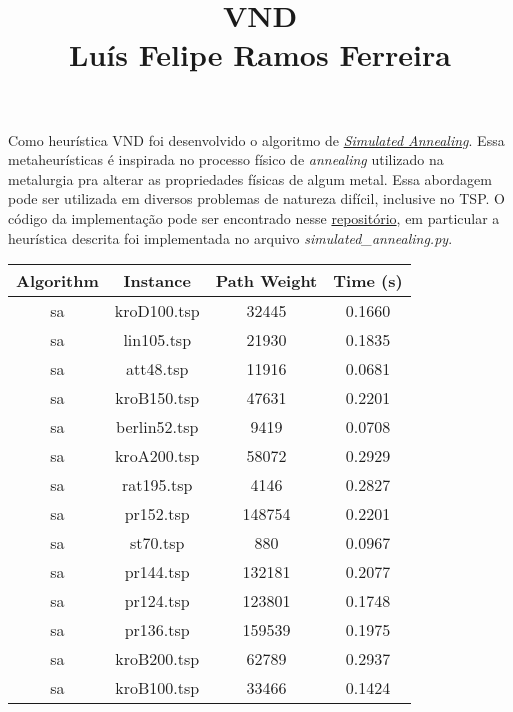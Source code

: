 \documentclass{article}
\title{\vspace{-3em} VND \\ Luís Felipe Ramos Ferreira \vspace{-3em}}
\date{}
\begin{document}
\maketitle

Como heurística VND foi desenvolvido o algoritmo de \href{https://en.wikipedia.org/wiki/Simulated_annealing}{\textit{Simulated Annealing}}. Essa metaheurísticas é inspirada
no processo físico de \textit{annealing} utilizado na metalurgia pra alterar as propriedades físicas de algum metal. Essa abordagem pode ser utilizada em diversos problemas de natureza difícil,
inclusive no TSP. O código da implementação pode ser encontrado nesse \href{https://github.com/lframosferreira/tsp-heuristics}{repositório}, em particular a heurística descrita foi implementada no arquivo
\textit{simulated\_annealing.py}.

\begin{center}
	\begin{table}[h!]
		\centering
		\begin{tabular}{|c|c|c|c|}
			\hline
			Algorithm & Instance     & Path Weight & Time (s) \\ \hline
			sa        & kroD100.tsp  & 32445       & 0.1660   \\ \hline
			sa        & lin105.tsp   & 21930       & 0.1835   \\ \hline
			sa        & att48.tsp    & 11916       & 0.0681   \\ \hline
			sa        & kroB150.tsp  & 47631       & 0.2201   \\ \hline
			sa        & berlin52.tsp & 9419        & 0.0708   \\ \hline
			sa        & kroA200.tsp  & 58072       & 0.2929   \\ \hline
			sa        & rat195.tsp   & 4146        & 0.2827   \\ \hline
			sa        & pr152.tsp    & 148754      & 0.2201   \\ \hline
			sa        & st70.tsp     & 880         & 0.0967   \\ \hline
			sa        & pr144.tsp    & 132181      & 0.2077   \\ \hline
			sa        & pr124.tsp    & 123801      & 0.1748   \\ \hline
			sa        & pr136.tsp    & 159539      & 0.1975   \\ \hline
			sa        & kroB200.tsp  & 62789       & 0.2937   \\ \hline
			sa        & kroB100.tsp  & 33466       & 0.1424   \\ \hline

\end{tabular}
\end{table}
\end{center}
\end{document}
